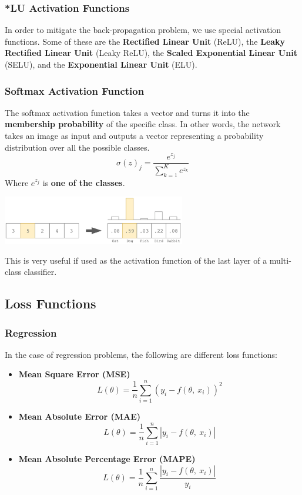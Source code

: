 \documentclass{article}
\begin{document}
\subsubsection{*LU Activation Functions}
In order to mitigate the back-propagation problem, we use special activation functions. Some of these are the \textbf{Rectified Linear Unit} (ReLU), the \textbf{Leaky Rectified Linear Unit} (Leaky ReLU), the \textbf{Scaled Exponential Linear Unit} (SELU), and the \textbf{Exponential Linear Unit} (ELU).

\subsubsection{Softmax Activation Function}
The softmax activation function takes a vector and turns it into the \textbf{membership probability} of the specific class. In other words, the network takes an image as input and outputs a vector representing a probability distribution over all the possible classes.
\[ \sigma (z)_j = \frac{e^{z_j}}{\sum^K_{k = 1}e^{z_k}} \]
Where $e^{z_j}$ is \textbf{one of the classes}.

\begin{center}
	\includegraphics[width=8cm]{assets/softmax.png}
\end{center}
This is very useful if used as the activation function of the last layer of a multi-class classifier.

\subsection{Loss Functions}
\subsubsection{Regression}
In the case of regression problems, the following are different loss functions:

\begin{itemize}
	\item \textbf{Mean Square Error (MSE)}
	\[ L(\theta) = \displaystyle\frac{1}{n} \sum^n_{i=1} (y_i - f(\theta,~x_i))^2 \]
	
	\item \textbf{Mean Absolute Error (MAE)}
	\[ L(\theta) = \displaystyle\frac{1}{n} \sum^n_{i=1} \left|y_i - f(\theta,~x_i)\right| \]
	
	\item \textbf{Mean Absolute Percentage Error (MAPE)}
	\[ L(\theta) = \displaystyle\frac{1}{n} \sum^n_{i=1} \frac{\left|y_i - f(\theta,~x_i)\right|}{y_i} \]
\end{itemize}
\end{document}
